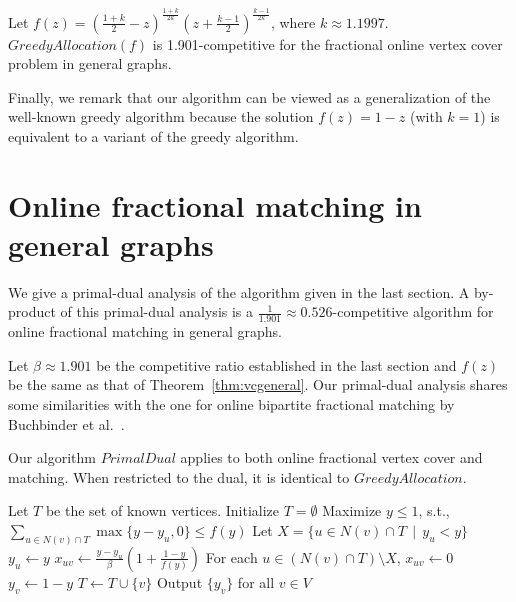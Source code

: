 \documentclass{article}
\begin{document}
\begin{theorem}
\label{thm:vcgeneral}
Let $f(z)=\left(\frac{1+k}{2}-z\right)^{\frac{1+k}{2k}}\left(z+\frac{k-1}{2}\right)^{\frac{k-1}{2k}}$, where $k\approx1.1997$. $GreedyAllocation(f)$ is 1.901-competitive for the fractional online vertex cover problem in general graphs.
\end{theorem}

Finally, we remark that our algorithm can be viewed as a generalization of the well-known greedy algorithm because the solution $f(z)=1-z$ (with $k=1$) is equivalent to a variant of the greedy algorithm.

\section{Online fractional matching in general graphs}
We give a primal-dual analysis of the algorithm given in the last section. 
%
A by-product of this primal-dual analysis is a $\frac{1}{1.901}\approx 0.526$-competitive algorithm for online fractional matching in general graphs.

Let $\beta\approx 1.901$ be the competitive ratio established in the last section and $f(z)$ be the same as that of Theorem~\ref{thm:vcgeneral}. Our primal-dual analysis shares some similarities with the one for online bipartite fractional matching by Buchbinder et al.~\cite{Buchbinder2007}.

%
%

Our algorithm $PrimalDual$ applies to both online fractional vertex cover and matching.  When restricted to the dual, it is identical to $GreedyAllocation$. 

\begin{algorithm}[h!]
\SetAlgoLined
\caption{$PrimalDual$}
\label{alg:general greedy}
Let $T$ be the set of known vertices. Initialize $T=\emptyset$\;
{
Maximize $y\le 1$, s.t., $\sum_{u\in N(v)\cap T} \max\{y-y_u,0\} \leq f(y)$\;
Let $X = \{u \in N(v)\cap T \,\mid\, y_u < y\}$\;
{
$y_u\leftarrow y$\;
$x_{uv}\longleftarrow \frac{y-y_u}{\beta}\left(1+\frac{1-y}{f(y)}\right)$\;
}
For each $u \in (N(v)\cap T)\setminus X$, $x_{uv}\longleftarrow 0$\;
$y_v \leftarrow 1-y$\;
$T\leftarrow T\cup \{v\}$\;
}
Output $\{y_v\}$ for all $v\in V$\;
\end{algorithm}
\end{document}
